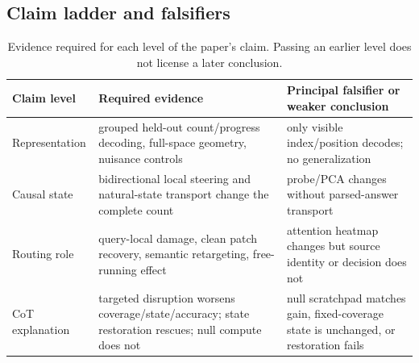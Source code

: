 \subsection{Claim ladder and falsifiers}

\begin{table}[H]
\centering
\small
\caption{Evidence required for each level of the paper's claim. Passing an earlier level does not license a later conclusion.}
\label{tab:claim-ladder}
\begin{tabularx}{\textwidth}{@{}P{.17\textwidth}P{.27\textwidth}Y@{}}
\toprule
Claim level & Required evidence & Principal falsifier or weaker conclusion \\
\midrule
Representation
  & grouped held-out count/progress decoding, full-space geometry, nuisance controls
  & only visible index/position decodes; no generalization \\
Causal state
  & bidirectional local steering and natural-state transport change the complete count
  & probe/PCA changes without parsed-answer transport \\
Routing role
  & query-local damage, clean patch recovery, semantic retargeting, free-running effect
  & attention heatmap changes but source identity or decision does not \\
CoT explanation
  & targeted disruption worsens coverage/state/accuracy; state restoration rescues; null compute does not
  & null scratchpad matches gain, fixed-coverage state is unchanged, or restoration fails \\
\bottomrule
\end{tabularx}
\end{table}
